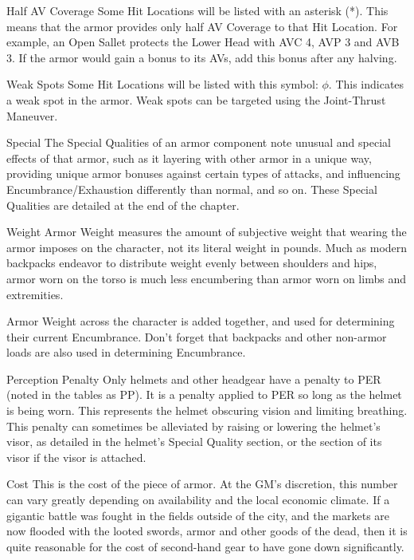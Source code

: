 \documentclass[oneside,11pt,english]{book}
\begin{document}
Half AV Coverage 
Some Hit Locations will be listed with an asterisk (*). This means that the armor provides only half AV 
Coverage to that Hit Location. For example, an Open Sallet protects the Lower Head with AVC 4, AVP 3 
and AVB 3. If the armor would gain a bonus to its AVs, add this bonus after any halving. 

 

Weak Spots 
Some Hit Locations will be listed with this symbol: $\phi$. This indicates a weak spot in the armor. Weak 
spots can be targeted using the Joint-Thrust Maneuver. 

 

Special 
The Special Qualities of an armor component note unusual and special effects of that armor, such as it 
layering with other armor in a unique way, providing unique armor bonuses against certain types of 
attacks, and influencing Encumbrance/Exhaustion differently than normal, and so on. These Special 
Qualities are detailed at the end of the chapter. 

 

Weight 
Armor Weight measures the amount of subjective weight that wearing the armor imposes on the 
character, not its literal weight in pounds. Much as modern backpacks endeavor to distribute weight 
evenly between shoulders and hips, armor worn on the torso is much less encumbering than armor worn 
on limbs and extremities. 

 

Armor Weight across the character is added together, and used for determining their current 
Encumbrance. Don’t forget that backpacks and other non-armor loads are also used in determining 
Encumbrance. 

 

Perception Penalty 
Only helmets and other headgear have a penalty to PER (noted in the tables as PP). It is a penalty applied 
to PER so long as the helmet is being worn. This represents the helmet obscuring vision and limiting 
breathing. This penalty can sometimes be alleviated by raising or lowering the helmet’s visor, as detailed 
in the helmet’s Special Quality section, or the section of its visor if the visor is attached. 

 

Cost 
This is the cost of the piece of armor. At the GM’s discretion, this number can vary greatly depending on 
availability and the local economic climate. If a gigantic battle was fought in the fields outside of the city, 
and the markets are now flooded with the looted swords, armor and other goods of the dead, then it is 
quite reasonable for the cost of second-hand gear to have gone down significantly. 
\end{document}
